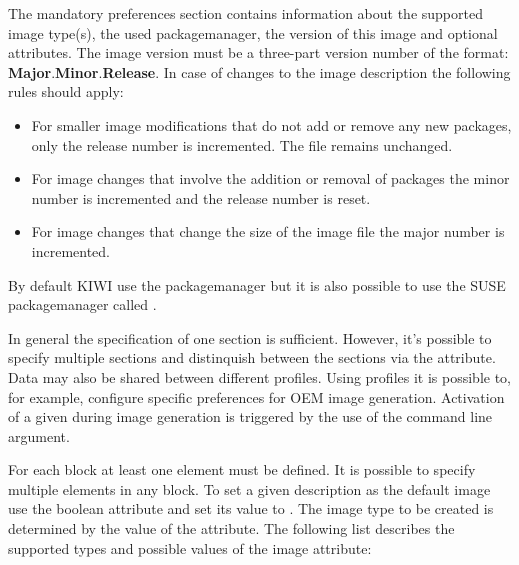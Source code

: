The mandatory preferences section contains information about the supported
image type(s), the used packagemanager, the version of this image and
optional attributes. The image version must be a three-part version number of
the format: \textbf{Major}.\textbf{Minor}.\textbf{Release}. In case of
changes to the image description the following rules should apply:

\begin{itemize}
\item For smaller image modifications that do not add or remove any
      new packages, only the release number is incremented.
      The  file remains unchanged.
\item For image changes that involve the addition or removal of packages
      the minor number is incremented and the release number is reset.
\item For image changes that change the size of the image file
      the major number is incremented.
\end{itemize}

By default KIWI use the  packagemanager but it is also possible
to use the SUSE packagemanager called . 

In general the specification of one  section is sufficient.
However, it's possible to specify multiple  sections and
distinquish between the sections via the  attribute. Data
may also be shared between different profiles. Using profiles it is possible
to, for example, configure specific preferences for OEM image generation. 
Activation of a given  during image generation is triggered by
the use of the  command line argument.

For each  block at least one  element must be
defined. It is possible to specify multiple  elements in any 
 block. To set a given  description as the default image
use the boolean attribute  and set its value to .
The image type to be created is determined by the value of the 
attribute. The following list describes the supported types and possible
values of the image attribute:

